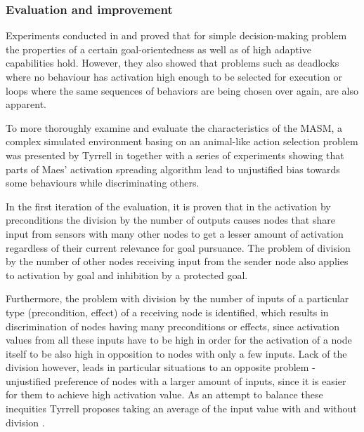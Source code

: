 \subsubsection{Evaluation and improvement} \label{state:evaluation-and-improvement}
Experiments conducted in \cite{maes2} and \cite{maes} proved that for simple decision-making problem the properties of a certain goal-orientedness as well as of high adaptive capabilities hold. However, they also showed  that problems such as deadlocks where no behaviour has activation high enough to be selected for execution or loops where the same sequences of behaviors are being chosen over again, are also apparent.\par
To more thoroughly examine and evaluate the characteristics of the  MASM, a complex simulated environment basing on an animal-like action selection problem was presented by Tyrrell in \cite{tyrrell} together with a series of experiments showing that parts of Maes' activation spreading algorithm lead to unjustified bias towards some behaviours while discriminating others. \par 
In the first iteration of the evaluation, it is proven that in the activation by preconditions the division by the number of outputs causes nodes that share input from sensors with many other nodes to get a lesser amount of activation regardless of their current relevance for goal pursuance. The problem of division by the number of other nodes receiving input from the sender node also applies to activation by goal and inhibition by a protected goal.\par
Furthermore, the problem  with division by the number of inputs of a particular type (precondition, effect) of a receiving node is identified, which results in discrimination of nodes having many preconditions or effects, since activation values from all these inputs have to be high in order for the activation of a node itself to be also high in opposition to nodes with only a few inputs. Lack of the division however, leads in particular situations to an opposite problem - unjustified preference of nodes with a larger amount of inputs, since it is easier for them to achieve high activation value. As an attempt to balance these inequities Tyrrell proposes taking an average of the input value with and without division \cite{tyrrell}. \par
